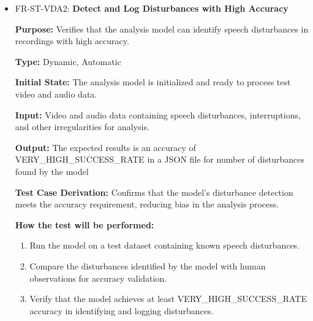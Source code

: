 \documentclass[12pt, titlepage]{article}
\begin{document}
\begin{itemize}
  \item FR-ST-VDA2: \textbf{Detect and Log Disturbances with High Accuracy}
  \begin{mdframed}[linewidth=0.5mm]
      \textbf{Purpose:} Verifies that the analysis model can identify speech disturbances in recordings with high accuracy. \par
      \textbf{Type:} Dynamic, Automatic \par
      \textbf{Initial State:} The analysis model is initialized and ready to process test video and audio data. \par
      \textbf{Input:} Video and audio data containing speech disturbances, interruptions, and other irregularities for analysis. \par
      \textbf{Output:} The expected results is an accuracy of VERY\_HIGH\_SUCCESS\_RATE in a JSON file for number of disturbances found by the model \par
      \textbf{Test Case Derivation:} Confirms that the model’s disturbance detection meets the accuracy requirement, reducing bias in the analysis process. \par
      \textbf{How the test will be performed:}
      \begin{enumerate}[noitemsep]
        \item Run the model on a test dataset containing known speech disturbances.
        \item Compare the disturbances identified by the model with human observations for accuracy validation.
        \item Verify that the model achieves at least VERY\_HIGH\_SUCCESS\_RATE \\ accuracy in identifying and logging disturbances.
      \end{enumerate}
  \end{mdframed}


\end{itemize}
\end{document}
